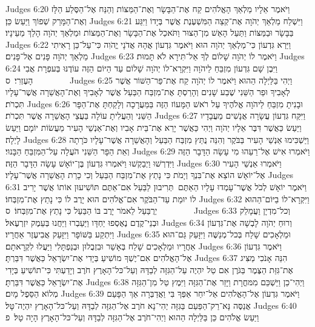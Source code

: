 Judges 6:20	וַיֹּאמֶר אֵלָיו מַלְאַךְ הָאֱלֹהִים קַח אֶת־הַבָּשָׂר וְאֶת־הַמַּצּוֹת וְהַנַּח אֶל־הַסֶּלַע הַלָּז וְאֶת־הַמָּרַק שְׁפוֹךְ וַיַּעַשׂ כֵּן׃
Judges 6:21	וַיִּשְׁלַח מַלְאַךְ יְהֹוָה אֶת־קְצֵה הַמִּשְׁעֶנֶת אֲשֶׁר בְּיָדוֹ וַיִּגַּע בַּבָּשָׂר וּבַמַּצּוֹת וַתַּעַל הָאֵשׁ מִן־הַצּוּר וַתֹּאכַל אֶת־הַבָּשָׂר וְאֶת־הַמַּצּוֹת וּמַלְאַךְ יְהֹוָה הָלַךְ מֵעֵינָיו׃
Judges 6:22	וַיַּרְא גִּדְעוֹן כִּי־מַלְאַךְ יְהֹוָה הוּא וַיֹּאמֶר גִּדְעוֹן אֲהָהּ אֲדֹנָי יֱהֹוִה כִּי־עַל־כֵּן רָאִיתִי מַלְאַךְ יְהֹוָה פָּנִים אֶל־פָּנִים׃
Judges 6:23	וַיֹּאמֶר לוֹ יְהֹוָה שָׁלוֹם לְךָ אַל־תִּירָא לֹא תָּמוּת׃
Judges 6:24	וַיִּבֶן שָׁם גִּדְעוֹן מִזְבֵּחַ לַיהֹוָה וַיִּקְרָא־לוֹ יְהֹוָה שָׁלוֹם עַד הַיּוֹם הַזֶּה עוֹדֶנּוּ בְּעפְרָת אֲבִי הָעֶזְרִי׃ {ס}        
Judges 6:25	וַיְהִי בַּלַּיְלָה הַהוּא וַיֹּאמֶר לוֹ יְהֹוָה קַח אֶת־פַּר־הַשּׁוֹר אֲשֶׁר לְאָבִיךָ וּפַר הַשֵּׁנִי שֶׁבַע שָׁנִים וְהָרַסְתָּ אֶת־מִזְבַּח הַבַּעַל אֲשֶׁר לְאָבִיךָ וְאֶת־הָאֲשֵׁרָה אֲשֶׁר־עָלָיו תִּכְרֹת׃
Judges 6:26	וּבָנִיתָ מִזְבֵּחַ לַיהֹוָה אֱלֹהֶיךָ עַל רֹאשׁ הַמָּעוֹז הַזֶּה בַּמַּעֲרָכָה וְלָקַחְתָּ אֶת־הַפָּר הַשֵּׁנִי וְהַעֲלִיתָ עוֹלָה בַּעֲצֵי הָאֲשֵׁרָה אֲשֶׁר תִּכְרֹת׃
Judges 6:27	וַיִּקַּח גִּדְעוֹן עֲשָׂרָה אֲנָשִׁים מֵעֲבָדָיו וַיַּעַשׂ כַּאֲשֶׁר דִּבֶּר אֵלָיו יְהֹוָה וַיְהִי כַּאֲשֶׁר יָרֵא אֶת־בֵּית אָבִיו וְאֶת־אַנְשֵׁי הָעִיר מֵעֲשׂוֹת יוֹמָם וַיַּעַשׂ לָיְלָה׃
Judges 6:28	וַיַּשְׁכִּימוּ אַנְשֵׁי הָעִיר בַּבֹּקֶר וְהִנֵּה נֻתַּץ מִזְבַּח הַבַּעַל וְהָאֲשֵׁרָה אֲשֶׁר־עָלָיו כֹּרָתָה וְאֵת הַפָּר הַשֵּׁנִי הֹעֲלָה עַל־הַמִּזְבֵּחַ הַבָּנוּי׃
Judges 6:29	וַיֹּאמְרוּ אִישׁ אֶל־רֵעֵהוּ מִי עָשָׂה הַדָּבָר הַזֶּה וַיִּדְרְשׁוּ וַיְבַקְשׁוּ וַיֹּאמְרוּ גִּדְעוֹן בֶּן־יוֹאָשׁ עָשָׂה הַדָּבָר הַזֶּה׃
Judges 6:30	וַיֹּאמְרוּ אַנְשֵׁי הָעִיר אֶל־יוֹאָשׁ הוֹצֵא אֶת־בִּנְךָ וְיָמֹת כִּי נָתַץ אֶת־מִזְבַּח הַבַּעַל וְכִי כָרַת הָאֲשֵׁרָה אֲשֶׁר־עָלָיו׃
Judges 6:31	וַיֹּאמֶר יוֹאָשׁ לְכֹל אֲשֶׁר־עָמְדוּ עָלָיו הַאַתֶּם  תְּרִיבוּן לַבַּעַל אִם־אַתֶּם תּוֹשִׁיעוּן אוֹתוֹ אֲשֶׁר יָרִיב לוֹ יוּמַת עַד־הַבֹּקֶר אִם־אֱלֹהִים הוּא יָרֶב לוֹ כִּי נָתַץ אֶת־מִזְבְּחוֹ׃
Judges 6:32	וַיִּקְרָא־לוֹ בַיּוֹם־הַהוּא יְרֻבַּעַל לֵאמֹר יָרֶב בּוֹ הַבַּעַל כִּי נָתַץ אֶת־מִזְבְּחוֹ׃ {ס}        
Judges 6:33	וְכל־מִדְיָן וַעֲמָלֵק וּבְנֵי־קֶדֶם נֶאֶסְפוּ יַחְדָּו וַיַּעַבְרוּ וַיַּחֲנוּ בְּעֵמֶק יִזְרְעֶאל׃
Judges 6:34	וְרוּחַ יְהֹוָה לָבְשָׁה אֶת־גִּדְעוֹן וַיִּתְקַע בַּשּׁוֹפָר וַיִּזָּעֵק אֲבִיעֶזֶר אַחֲרָיו׃
Judges 6:35	וּמַלְאָכִים שָׁלַח בְּכל־מְנַשֶּׁה וַיִּזָּעֵק גַּם־הוּא אַחֲרָיו וּמַלְאָכִים שָׁלַח בְּאָשֵׁר וּבִזְבֻלוּן וּבְנַפְתָּלִי וַיַּעֲלוּ לִקְרָאתָם׃
Judges 6:36	וַיֹּאמֶר גִּדְעוֹן אֶל־הָאֱלֹהִים אִם־יֶשְׁךָ מוֹשִׁיעַ בְּיָדִי אֶת־יִשְׂרָאֵל כַּאֲשֶׁר דִּבַּרְתָּ׃
Judges 6:37	הִנֵּה אָנֹכִי מַצִּיג אֶת־גִּזַּת הַצֶּמֶר בַּגֹּרֶן אִם טַל יִהְיֶה עַל־הַגִּזָּה לְבַדָּהּ וְעַל־כּל־הָאָרֶץ חֹרֶב וְיָדַעְתִּי כִּי־תוֹשִׁיעַ בְּיָדִי אֶת־יִשְׂרָאֵל כַּאֲשֶׁר דִּבַּרְתָּ׃
Judges 6:38	וַיְהִי־כֵן וַיַּשְׁכֵּם מִמּחֳרָת וַיָּזַר אֶת־הַגִּזָּה וַיִּמֶץ טַל מִן־הַגִּזָּה מְלוֹא הַסֵּפֶל מָיִם׃
Judges 6:39	וַיֹּאמֶר גִּדְעוֹן אֶל־הָאֱלֹהִים אַל־יִחַר אַפְּךָ בִּי וַאֲדַבְּרָה אַךְ הַפָּעַם אֲנַסֶּה נָּא־רַק־הַפַּעַם בַּגִּזָּה יְהִי־נָא חֹרֶב אֶל־הַגִּזָּה לְבַדָּהּ וְעַל־כּל־הָאָרֶץ יִהְיֶה־טָּל׃
Judges 6:40	וַיַּעַשׂ אֱלֹהִים כֵּן בַּלַּיְלָה הַהוּא וַיְהִי־חֹרֶב אֶל־הַגִּזָּה לְבַדָּהּ וְעַל־כּל־הָאָרֶץ הָיָה טָל׃ {פ}

